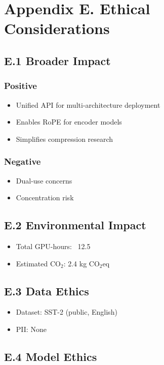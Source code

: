 
\section{Appendix E. Ethical Considerations}

\subsection{E.1 Broader Impact}

\subsubsection{Positive}
\begin{itemize}
\item Unified API for multi-architecture deployment
\item Enables RoPE for encoder models
\item Simplifies compression research

\end{itemize}
\subsubsection{Negative}
\begin{itemize}
\item Dual-use concerns
\item Concentration risk

\end{itemize}
\subsection{E.2 Environmental Impact}

\begin{itemize}
\item Total GPU-hours: ~12.5
\item Estimated CO$_2$: 2.4 kg CO$_2$eq

\end{itemize}
\subsection{E.3 Data Ethics}

\begin{itemize}
\item Dataset: SST-2 (public, English)
\item PII: None

\end{itemize}
\subsection{E.4 Model Ethics}

